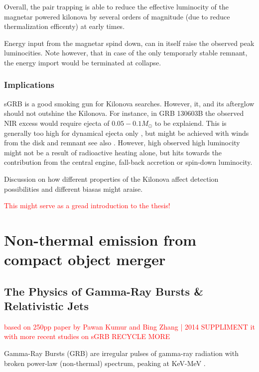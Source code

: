 \documentclass[11pt,a4paper,headinclude=true,DIV=14,BCOR=8mm,chapterprefix,listof=totoc,twoside,openright,abstracton]{scrbook}
\newcommand{\red}[1]{\textcolor{red}{#1}}
\begin{document}
Overall, the pair trapping is able to reduce the effective luminocity of the magnetar powered kilonova by several orders of magnitude (due to reduce thermalization efficenty) at early times.

Energy input from the magnetar spind down, can in itself raise the observed peak luminocities. Note however, that in case of the only temporarly stable remnant, the energy import would be terminated at collapse.


\subsection{Implications}

sGRB is a good smoking gun for Kilonova searches.
However, it, and its afterglow should not outshine the Kilonova. For instance, in GRB 130603B \cite{(Berger et al 2013; Tanvir et al 2013)} the observed NIR excess would require ejecta of $0.05-0.1M_{\odot}$ to be explaiend. This is generally too high for dynamical ejecta only \cite{(Hotokezaka et al 2013b; Tanaka et al 2014; Kawaguchi et al 2016).}, but might be achieved with winds from the disk and remnant \cite{(Metzger and Fernandez 2014)} see also \cite{Kasen et al 2015)}. However, high observed high luminocity might not be a result of radioactive heating alone, but hits towards the contribution from the central engine, fall-back accretion or spin-down luminocity.

Discussion on how different properties of the Kilonova affect detection possibilities and different biasas might araise.

\red{This might serve as a gread introduction to the thesis!}


\chapter{Non-thermal emission from compact object merger}

\section{The Physics of Gamma-Ray Bursts \& Relativistic Jets}
\red{based on 250pp paper by Pawan Kumur and Bing Zhang | 2014}
\red{SUPPLIMENT it with more recent studies on sGRB}
\red{RECYCLE MORE}

Gamma-Ray Bursts (GRB) are irregular pulses of gamma-ray radiation with broken power-law (non-thermal) spectrum, peaking at KeV-MeV \cite{Band et al., 1993; Kouveliotou et al., 1993; Meegan et al., 1992}.
\end{document}
